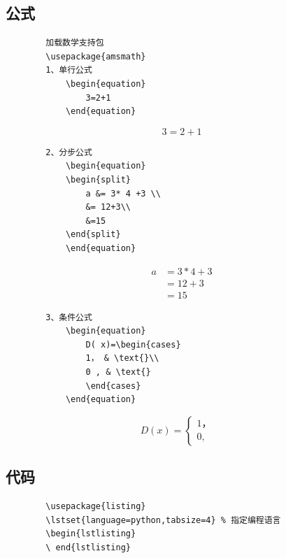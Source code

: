 \documentclass[a4paper]{article}
\begin{document}
	\subsection{公式}
	\begin{lstlisting}
		加载数学支持包
		\usepackage{amsmath}
		1、单行公式
			\begin{equation}
				3=2+1
			\end{equation}
	\end{lstlisting}
	\begin{equation}
		3=2+1
	\end{equation}
	\begin{lstlisting}
		2、分步公式
			\begin{equation}
			\begin{split}
				a &= 3* 4 +3 \\
				&= 12+3\\
				&=15
			\end{split}
			\end{equation}
	\end{lstlisting}
		\begin{align*}
		a &= 3* 4 +3 \\
		&= 12+3\\
		&=15
	\end{align*}
	\begin{lstlisting}
		3、条件公式
			\begin{equation}
				D( x)=\begin{cases}
				1， & \text{}\\
				0 , & \text{}
				\end{cases}
			\end{equation}
	\end{lstlisting}
		\begin{equation}
		D( x)=\begin{cases}
			1， & \text{}\\
		0 , & \text{}
		\end{cases}
	\end{equation}
	\subsection{代码}
	\begin{lstlisting}
		\usepackage{listing}
		\lstset{language=python,tabsize=4} % 指定编程语言
		\begin{lstlisting}
		\ end{lstlisting}
	\end{lstlisting}
	
\end{document}

